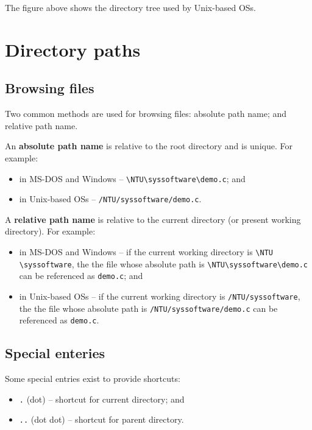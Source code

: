 \documentclass[a4paper]{systems-software}
\begin{document}
The figure above shows the directory tree used by Unix-based OSs.


\newpage

\section*{Directory paths}

\subsection*{Browsing files}

Two common methods are used for browsing files: absolute path name; and relative path name.

An \textbf{absolute path name} is relative to the root directory and is unique. For example:
\begin{itemize}
	\item in MS-DOS and Windows -- \texttt{\textbackslash NTU\textbackslash syssoftware\textbackslash demo.c}; and
	\item in Unix-based OSs -- \texttt{/NTU/syssoftware/demo.c}.
\end{itemize}

A \textbf{relative path name} is relative to the current directory (or present working directory). For example:
\begin{itemize}
	\item in MS-DOS and Windows -- if the current working directory is \texttt{\textbackslash NTU \textbackslash syssoftware}, the the file whose absolute path is \texttt{\textbackslash NTU\textbackslash syssoftware\textbackslash demo.c} can be referenced as \texttt{demo.c}; and
	\item in Unix-based OSs -- if the current working directory is \texttt{/NTU/syssoftware}, the the file whose absolute path is \texttt{/NTU/syssoftware/demo.c} can be referenced as \texttt{demo.c}.
\end{itemize}

\subsection*{Special enteries}

Some special entries exist to provide shortcuts:
\begin{itemize}
	\item \texttt{.} (dot) -- shortcut for current directory; and
	\item \texttt{..} (dot dot) -- shortcut for parent directory.
\end{itemize}
\end{document}
